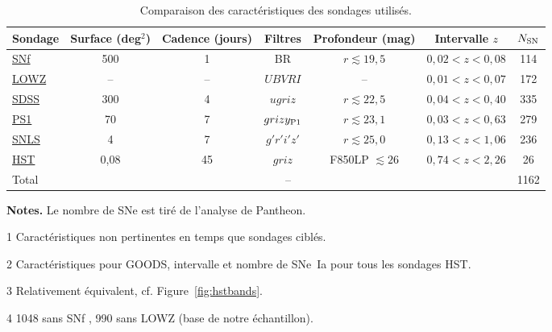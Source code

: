 \documentclass[../main/main.tex]{subfiles}
\begin{document}
\begin{table}[ht]
    \centerfloat
    \begin{threeparttable}
        \caption{Comparaison des caractéristiques des sondages utilisés.}
        \label{tab:sondcomp}
        \begin{tabular}{lcccccc}
            \toprule
            Sondage              &
            Surface (deg$^2$)    & Cadence (jours)   & Filtres          &
            Profondeur (mag)     & Intervalle $z$    & $N_{\rm SN}$\\
            \midrule
            \hyperref[ssec:snf]{SNf} &
            500                      & 1                 & BR               &
            $r \lesssim 19,5$        & $0,02 < z < 0,08$ & 114\\
            \hyperref[ssec:lowz]{LOWZ}\tnote{1}            &
            --                       & --                & $UBVRI$          &
            --                       & $0,01 < z < 0,07$ & 172\\
            \hyperref[ssec:sdss]{SDSS}                     &
            300                      & 4                 & $ugriz$          &
            $r \lesssim 22,5$        & $0,04 < z < 0,40$ & 335\\
            \hyperref[ssec:ps1]{PS1}                      &
            70                       & 7                 & $grizy_{\rm P1}$ &
            $r \lesssim 23,1$        & $0,03 < z < 0,63$ & 279\\
            \hyperref[ssec:snls]{SNLS}                     &
            4                        & 7                 & $g'r'i'z'$       &
            $r \lesssim 25,0$        & $0,13 < z < 1,06$ & 236\\
            \hyperref[ssec:hst]{HST}\tnote{1}             &
            0,08                     & 45                & $griz$\tnote{2}  &
            F850LP $\lesssim 26$     & $0,74 < z < 2,26$ & 26\\
            \midrule
            Total & \multicolumn{5}{c}{--} & 1162\tnote{3}\\
            \bottomrule
        \end{tabular}
        \begin{tablenotes}[flushleft]
        \item \textbf{\hspace{-3,2pt}Notes.} Le nombre de SNe est tiré de
            l'analyse de Pantheon.
        \item [1] Caractéristiques non pertinentes en temps que sondages ciblés.
        \item [2] Caractéristiques pour GOODS, intervalle et nombre de SNe~Ia
            pour tous les sondages HST.
        \item [3] Relativement équivalent, cf. Figure~\ref{fig:hstbands}.
        \item [4] 1048 sans SNf \citep{scolnic2018}, 990 sans LOWZ (base de
            notre échantillon).
        \end{tablenotes}
    \end{threeparttable}
\end{table}
\end{document}
